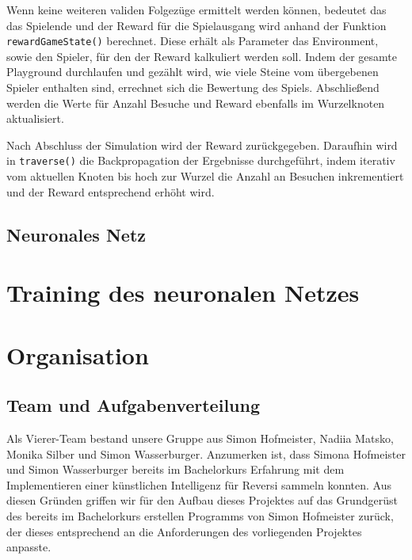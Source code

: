 \documentclass[12pt,a4paper]{article}
\begin{document}
Wenn keine weiteren validen Folgezüge ermittelt werden können, bedeutet das das Spielende und der Reward für die Spielausgang wird anhand der Funktion \texttt{rewardGameState()} berechnet. Diese erhält als Parameter das Environment, sowie den Spieler, für den der Reward kalkuliert werden soll. Indem der gesamte Playground durchlaufen und gezählt wird, wie viele Steine vom übergebenen Spieler enthalten sind, errechnet sich die Bewertung des Spiels. Abschließend werden die Werte für Anzahl Besuche und Reward ebenfalls im Wurzelknoten aktualisiert.

Nach Abschluss der Simulation wird der Reward zurückgegeben. Daraufhin wird in \texttt{traverse()} die Backpropagation der Ergebnisse durchgeführt, indem iterativ vom aktuellen Knoten bis hoch zur Wurzel die Anzahl an Besuchen inkrementiert und der Reward entsprechend erhöht wird.

\subsection{Neuronales Netz}

\newpage


\section{Training des neuronalen Netzes}



\newpage

\section{Organisation}

\subsection{Team und Aufgabenverteilung}
Als Vierer-Team bestand unsere Gruppe aus Simon Hofmeister, Nadiia Matsko, Monika Silber und Simon Wasserburger. Anzumerken ist, dass Simona Hofmeister und Simon Wasserburger bereits im Bachelorkurs Erfahrung mit dem Implementieren einer künstlichen Intelligenz für Reversi sammeln konnten. Aus diesen Gründen griffen wir für den Aufbau dieses Projektes auf das Grundgerüst des bereits im Bachelorkurs erstellen Programms von Simon Hofmeister zurück, der dieses entsprechend an die Anforderungen des vorliegenden Projektes anpasste.
\end{document}
